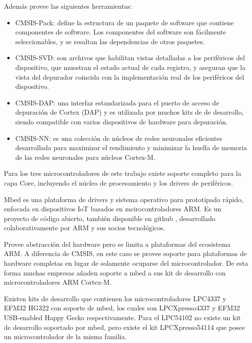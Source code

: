 Además provee las siguientes herramientas:

\begin{itemize}
\item
CMSIS-Pack: define la estructura de un paquete de software que contiene componentes de software. Los componentes del software son fácilmente seleccionables, y se resaltan las dependencias de otros paquetes.
\item
CMSIS-SVD: son archivos que habilitan vistas detalladas a los periféricos del dispositivo, que muestran el estado actual de cada registro, y aseguran que la vista del depurador coincida con la implementación real de los periféricos del dispositivo.
\item
CMSIS-DAP: una interfaz estandarizada para el puerto de acceso de depuración de Cortex (DAP) y es utilizada por muchos kits de de desarrollo, siendo compatible con varios dispositivos de hardware para depuración.
\item
CMSIS-NN: es una colección de núcleos de redes neuronales eficientes desarrollada para maximizar el rendimiento y minimizar la huella de memoria de las redes neuronales para núcleos Cortex-M.
\end{itemize}

Para los tres microcontroladores de este trabajo existe soporte completo para la capa Core, incluyendo el núcleo de procesamiento y los drivers de periféricos.


Mbed es una plataforma de drivers y sistema operativo para prototipado rápido, enfocada en dispositivos IoT basados en mcirocontroladores ARM. Es un proyecto de código abierto, también disponible en github \citep{MbedGit}, desarrollado colaborativamente por ARM y sus socios tecnológicos.

Provee abstracción del hardware pero se limita a plataformas del ecosistema ARM. A diferencia de CMSIS, en este caso se provee soporte para plataformas de hardware completas en lugar de solamente ocuparse del microcontrolador. De esta forma muchas empresas añaden soporte a mbed a sus kit de desarrollo con microcontroladores ARM Cortex-M. 

Existen kits de desarrollo que contienen los microcontroladores LPC4337 y EFM32 HG322 con soporte de mbed, los cuales son LPCXpresso4337 \citep{LPCXpresso4337board} y EFM32 USB-enabled Happy Gecko \citep{EFM32HGboard} respectivamente. Para el LPC54102 no existe un kit de desarrollo soportado por mbed, pero existe el kit LPCXpresso54114 \citep{LPCXpresso54114board} que posee un  microcontrolador de la misma familia.

